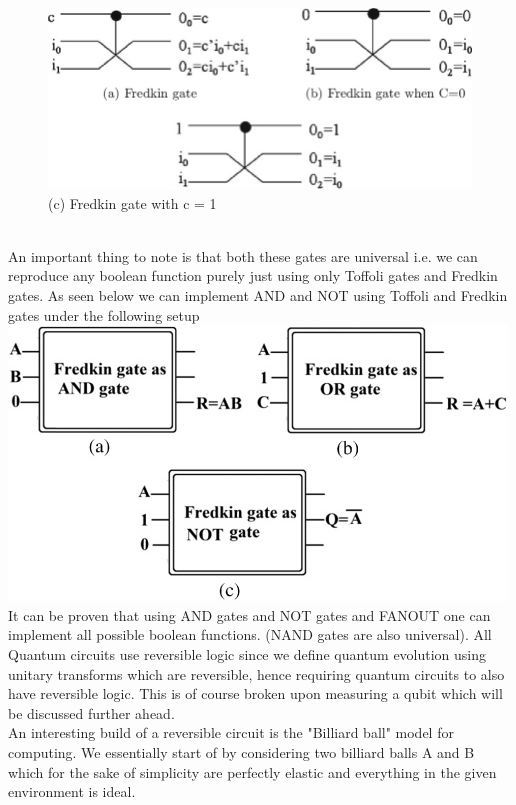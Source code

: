 \documentclass{report}
\begin{document}
\begin{figure}[ht]
    \centering
    \includegraphics[width = \textwidth]{images/fredkin.png}
    \captionsetup{labelformat = empty}
    \caption{(c) Fredkin gate with c = 1}
\end{figure}\\
An important thing to note is that both these gates are universal i.e. we can reproduce any boolean function purely just using only Toffoli gates and Fredkin gates. As seen below we can implement AND and NOT using Toffoli and Fredkin gates under the following setup\\
\includegraphics[width = \textwidth]{images/fredkin universal.jpg}\\
It can be proven that using AND gates and NOT gates and FANOUT one can implement all possible boolean functions. (NAND gates are also universal).
All Quantum circuits use reversible logic since we define quantum evolution using unitary transforms which are reversible, hence requiring quantum circuits to also have reversible logic. This is of course broken upon measuring a qubit which will be discussed further ahead.\\
An interesting build of a reversible circuit is the "Billiard ball" model for computing.
We essentially start of by considering two billiard balls A and B which for the sake of simplicity are perfectly elastic and everything in the given environment is ideal.
\end{document}
